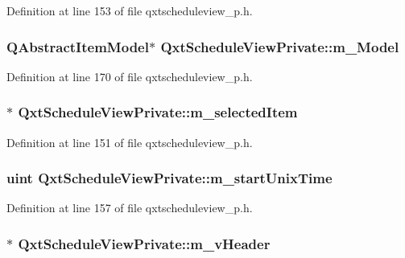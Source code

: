 Definition at line 153 of file qxtscheduleview\-\_\-p.\-h.

\hypertarget{class_qxt_schedule_view_private_af64379945aa97466a6a01989b238625b}{
\subsubsection[{m\-\_\-\-Model}]{\setlength{\rightskip}{0pt plus 5cm}Q\-Abstract\-Item\-Model$\ast$ Qxt\-Schedule\-View\-Private\-::m\-\_\-\-Model}}\label{class_qxt_schedule_view_private_af64379945aa97466a6a01989b238625b}


Definition at line 170 of file qxtscheduleview\-\_\-p.\-h.

\hypertarget{class_qxt_schedule_view_private_a5060fd61796c43856fbac971da90b605}{
\subsubsection[{m\-\_\-selected\-Item}]{$\ast$ Qxt\-Schedule\-View\-Private\-::m\-\_\-selected\-Item}}\label{class_qxt_schedule_view_private_a5060fd61796c43856fbac971da90b605}


Definition at line 151 of file qxtscheduleview\-\_\-p.\-h.

\hypertarget{class_qxt_schedule_view_private_a53606665328fa6a63c4c951b101f275d}{
\subsubsection[{m\-\_\-start\-Unix\-Time}]{\setlength{\rightskip}{0pt plus 5cm}uint Qxt\-Schedule\-View\-Private\-::m\-\_\-start\-Unix\-Time}}\label{class_qxt_schedule_view_private_a53606665328fa6a63c4c951b101f275d}


Definition at line 157 of file qxtscheduleview\-\_\-p.\-h.

\hypertarget{class_qxt_schedule_view_private_a2e1b737cbe6365e0912c0eba21eb3d2e}{
\subsubsection[{m\-\_\-v\-Header}]{$\ast$ Qxt\-Schedule\-View\-Private\-::m\-\_\-v\-Header}}\label{class_qxt_schedule_view_private_a2e1b737cbe6365e0912c0eba21eb3d2e}


